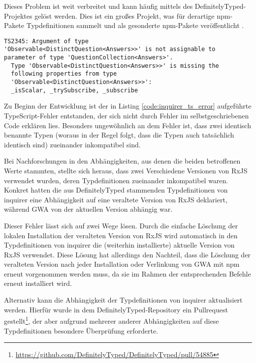 Dieses Problem ist weit verbreitet und kann häufig mittels des DefinitelyTyped-Projektes gelöst werden. Dies ist ein großes Projekt, was für derartige \gls{npm}-Pakete Typdefinitionen sammelt und als gesonderte \gls{npm}-Pakete veröffentlicht \cite{DT_github}.

\begin{lstlisting}[caption={TypeScript-Fehlermeldung bei der Verwendung von inquirer mit einem RxJS-Observable}, captionpos=b, label={code:inquirer_ts_error}]
TS2345: Argument of type
'Observable<DistinctQuestion<Answers>>' is not assignable to
parameter of type 'QuestionCollection<Answers>'.
  Type 'Observable<DistinctQuestion<Answers>>' is missing the
  following properties from type
  'Observable<DistinctQuestion<Answers>>':
  _isScalar, _trySubscribe, _subscribe
\end{lstlisting}

Zu Beginn der Entwicklung ist der in Listing \ref{code:inquirer_ts_error} aufgeführte TypeScript-Fehler entstanden, der sich nicht durch Fehler im selbstgeschriebenen Code erklären lies. Besonders ungewöhnlich an dem Fehler ist, dass zwei identisch benannte Typen (woraus in der Regel folgt, dass die Typen auch tatsächlich identisch sind) zueinander inkompatibel sind.

Bei Nachforschungen in den Abhängigkeiten, aus denen die beiden betroffenen Werte stammten, stellte sich heraus, dass zwei Verschiedene Versionen von RxJS verwendet wurden, deren Typdefinitionen zueinander inkompatibel waren. Konkret hatten die aus DefinitelyTyped stammenden Typdefinitionen von inquirer eine Abhängigkeit auf eine veraltete Version von RxJS deklariert, während \gls{GWA} von der aktuellen Version abhängig war.

Dieser Fehler lässt sich auf zwei Wege lösen. Durch die einfache Löschung der lokalen Installation der veralteten Version von RxJS wird automatisch in den Typdefinitionen von inquirer die (weiterhin installierte) aktuelle Version von RxJS verwendet. Diese Lösung hat allerdings den Nachteil, dass die Löschung der veralteten Version nach jeder Installation oder Verlinkung von \gls{GWA} mit \gls{npm} erneut vorgenommen werden muss, da sie im Rahmen der entsprechenden Befehle erneut installiert wird.

Alternativ kann die Abhängigkeit der Typdefinitionen von inquirer aktualisiert werden. Hierfür wurde in dem DefinitelyTyped-Repository ein Pullrequest gestellt\footnote{\url{https://github.com/DefinitelyTyped/DefinitelyTyped/pull/54885}}, der aber aufgrund mehrerer anderer Abhängigkeiten auf diese Typdefinitionen besondere Überprüfung erforderte.


